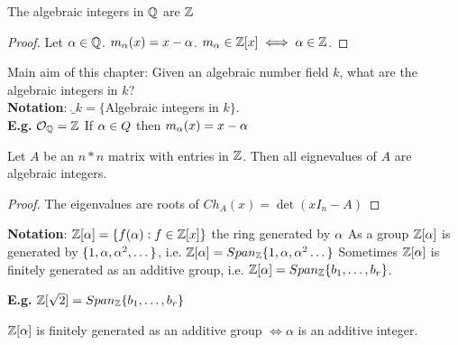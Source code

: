 \documentclass[11pt]{article}
\begin{document}
\begin{cor}
The algebraic integers in $\mathbb{Q}$ are $\mathbb{Z}$
\end{cor}
\begin{proof}
Let $\alpha \in \mathbb{Q} $.
	$m_\alpha(x) = x-\alpha $.
	$m_\alpha \in \mathbb{Z}[x] \iff \alpha \in \mathbb{Z}$.
\end{proof}
$ $\\[-0.5em]
Main aim of this chapter: Given an algebraic number field $k$, what are the algebraic integers in $k$?
$ $\\[1em]
\textbf{Notation}: $\ring_k = \{ $Algebraic integers in $k\}$.\\
\spa
\textbf{E.g.} $\mathcal{O}_{\mathbb{Q}} = \mathbb{Z}$ If $\alpha \in Q$ then $m_\alpha(x) = x-\alpha$



\begin{prop}
Let $A$ be an $n * n$ matrix with entries in $\mathbb{Z}$.
Then all eignevalues of $A$ are algebraic integers.
\end{prop}
\begin{proof}
	The eigenvalues are roots of $Ch_A(x) = \det(xI_n-A)$
\end{proof}
\spa
\textbf{Notation}:
$ \mathbb{Z} [ \alpha ] = \{f(\alpha) : f \in \mathbb{Z}[x] \}$ the ring generated by $\alpha$
\spac
As a group $\mathbb{Z}[\alpha]$ is generated by $\{1,\alpha,\alpha^2 , \dots \}$, i.e. $\mathbb{Z}[\alpha] = Span_{\mathbb{Z}}\{1,\alpha,\alpha^2 \dots \}$
\spac
Sometimes $\mathbb{Z}[\alpha]$ is finitely generated as an additive group, i.e. $\mathbb{Z}[\alpha] = Span_{\mathbb{Z}}\{b_1, \dots, b_r\}$.

\spa
\textbf{E.g.} $\mathbb{Z}[\sqrt{2}] = Span_{\mathbb{Z}}\{b_1, \dots, b_r\}$


\begin{prop}
	$\mathbb{Z}[\alpha]$ is finitely generated as an additive group $\iff \alpha$ is an additive integer.
\end{prop}
\end{document}
